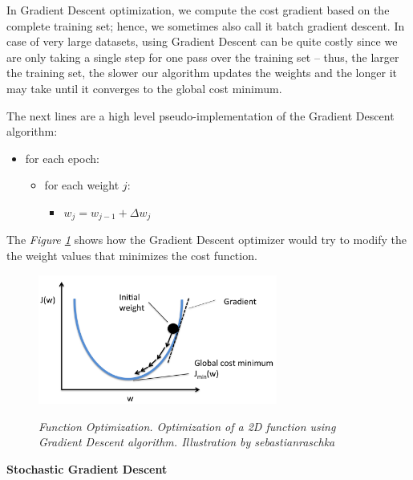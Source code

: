 In Gradient Descent optimization, we compute the cost gradient based on the complete training set; hence, we sometimes also call it batch gradient descent. In case of very large datasets, using Gradient Descent can be quite costly since we are only taking a single step for one pass over the training set – thus, the larger the training set, the slower our algorithm updates the weights and the longer it may take until it converges to the global cost minimum. \\

\newpage

The next lines are a high level pseudo-implementation of the Gradient Descent algorithm: 

\begin{itemize}[label=\(\circ\)]
  \item for each epoch:
  \begin{itemize}[label=\(\circ\), topsep=0pt]
    \item for each weight \(j\):
    \begin{itemize}[label=\(\circ\), topsep=5pt]
      \item \(w_j = w_{j-1} + \Delta w_j\)
    \end{itemize}
  \end{itemize}
\end{itemize}

The \textit{Figure \ref{fig:optimization}} shows how the Gradient Descent optimizer would try to modify the  the weight values that minimizes the cost function.

\begin{figure}[H]
\centering
\includegraphics[width=0.7\textwidth]{imatges/preliminaries/optimization.png}
    \caption[Function Optimization]{\textit{Function Optimization. Optimization of a 2D function using Gradient Descent algorithm. Illustration by sebastianraschka}}
{\label{fig:optimization}}
\end{figure}

\vspace{0.5cm}
\textbf{Stochastic Gradient Descent} \\

